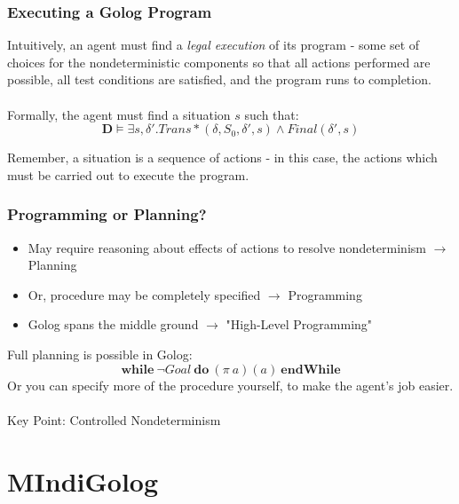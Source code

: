 \documentclass{beamer}
\begin{document}
\begin{frame}
\frametitle{Executing a Golog Program}
Intuitively, an agent must find a \emph{legal execution} of its program - some set of choices for the nondeterministic components so that all
actions performed are possible, all test conditions are satisfied, and the
program runs to completion.\\
\ \\
Formally, the agent must find a situation $s$ such that:\[
\mathbf{D} \models \exists s,\delta' . Trans*(\delta,S_0,\delta',s) \wedge Final(\delta',s)\]

Remember, a situation is a sequence of actions - in this case, the actions which must be carried out to execute the program.
\end{frame}

\begin{frame}
\frametitle{Programming or Planning?}
\begin{itemize}
  \item May require reasoning about effects of actions to resolve nondeterminism
$\rightarrow$ Planning
  \item Or, procedure may be completely specified $\rightarrow$ Programming
  \item Golog spans the middle ground $\rightarrow$ "High-Level Programming"
\end{itemize}
\pause
Full planning is possible in Golog:\[
\mathbf{while}\ \neg Goal\ \mathbf{do}\ (\pi\ a)(a)\ \mathbf{endWhile}\]
\pause
Or you can specify more of the procedure yourself, to make the agent's job
easier.\\
\ \\
Key Point: \alert{Controlled} Nondeterminism
\end{frame}


\section{MIndiGolog}
\end{document}
